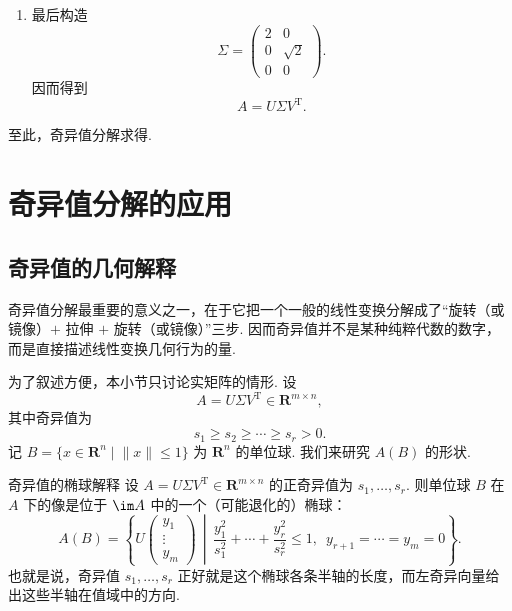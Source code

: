 \begin{solution}
\begin{enumerate}
        \item 最后构造
              \[
                  \Sigma =
                  \begin{pmatrix}
                      2 & 0        \\
                      0 & \sqrt{2} \\
                      0 & 0
                  \end{pmatrix}.
              \]
              因而得到
              \[
                  A = U\Sigma V^{\mathrm{T}}.
              \]
    \end{enumerate}

    至此，奇异值分解求得.
\end{solution}

\section{奇异值分解的应用}

\subsection{奇异值的几何解释}

奇异值分解最重要的意义之一，在于它把一个一般的线性变换分解成了“旋转（或镜像）$+$ 拉伸 $+$ 旋转（或镜像）”三步. 因而奇异值并不是某种纯粹代数的数字，而是直接描述线性变换几何行为的量.

为了叙述方便，本小节只讨论实矩阵的情形. 设
\[
    A = U\Sigma V^{\mathrm{T}} \in \mathbf{R}^{m \times n},
\]
其中奇异值为
\[
    s_1 \geqslant s_2 \geqslant \cdots \geqslant s_r > 0.
\]
记 $B = \{x \in \mathbf{R}^n \mid \lVert x \rVert \leqslant 1\}$ 为 $\mathbf{R}^n$ 的单位球. 我们来研究 $A(B)$ 的形状.

\begin{theorem}{}{奇异值的椭球解释}
    设 $A = U\Sigma V^{\mathrm{T}} \in \mathbf{R}^{m \times n}$ 的正奇异值为 $s_1, \ldots, s_r$. 则单位球 $B$ 在 $A$ 下的像是位于 $\im A$ 中的一个（可能退化的）椭球：
    \[
        A(B) =
        \left\{
            U
            \begin{pmatrix}
                y_1 \\
                \vdots \\
                y_m
            \end{pmatrix}
            \,\middle|\,
            \frac{y_1^2}{s_1^2} + \cdots + \frac{y_r^2}{s_r^2} \leqslant 1,\enspace
            y_{r+1} = \cdots = y_m = 0
        \right\}.
    \]
    也就是说，奇异值 $s_1, \ldots, s_r$ 正好就是这个椭球各条半轴的长度，而左奇异向量给出这些半轴在值域中的方向.
\end{theorem}

